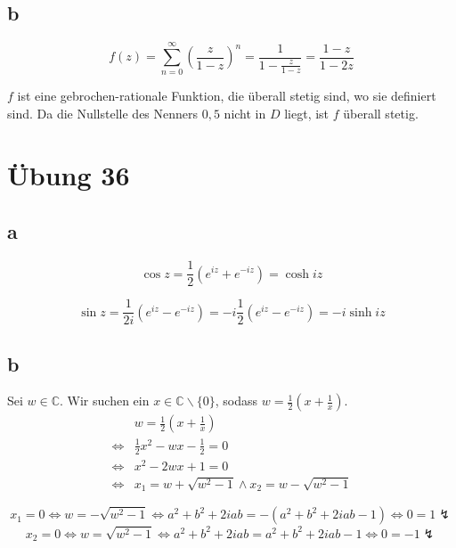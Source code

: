 \documentclass[a4paper,10pt]{article}
\begin{document}
\subsection*{b}

\begin{equation}
 f(z) = \sum_{n = 0}^\infty \left(\frac{z}{1 - z}\right)^n = \frac{1}{1 - \frac{z}{1 - z}} = \frac{1 - z}{1 - 2z}
\end{equation}

$f$ ist eine gebrochen-rationale Funktion, die überall stetig sind, wo sie definiert sind.
Da die Nullstelle des Nenners $0,5$ nicht in $D$ liegt, ist $f$ überall stetig.

\section*{Übung 36}

\subsection*{a}

\begin{equation}
 \cos z = \frac{1}{2}(e^{iz} + e^{-iz}) = \cosh iz
\end{equation}

\begin{equation}
 \sin z = \frac{1}{2i}(e^{iz} - e^{-iz}) = -i\frac{1}{2}(e^{iz} - e^{-iz}) = -i \sinh iz
\end{equation}

\subsection*{b}

Sei $w \in \mathbb{C}$.
Wir suchen ein $x \in \mathbb{C} \backslash \{0\}$, sodass $w = \frac{1}{2}(x + \frac{1}{x})$.
\begin{align}
 & w = \frac{1}{2}(x + \frac{1}{x})\\
 \Leftrightarrow & \frac{1}{2}x^2 - wx - \frac{1}{2} = 0\\
 \Leftrightarrow & x^2 - 2wx + 1 = 0\\
 \Leftrightarrow & x_1 = w + \sqrt{w^2 - 1} \land x_2 = w - \sqrt{w^2 - 1}
\end{align}

\begin{equation}
 x_1 = 0 \Leftrightarrow w = -\sqrt{w^2 - 1} \Leftrightarrow a^2 + b^2 + 2iab = -(a^2 + b^2 + 2iab - 1) \Leftrightarrow 0 = 1 \lightning
\end{equation}
\begin{equation}
 x_2 = 0 \Leftrightarrow w = \sqrt{w^2 - 1} \Leftrightarrow a^2 + b^2 + 2iab = a^2 + b^2 + 2iab - 1 \Leftrightarrow 0 = -1 \lightning
\end{equation}
\end{document}
